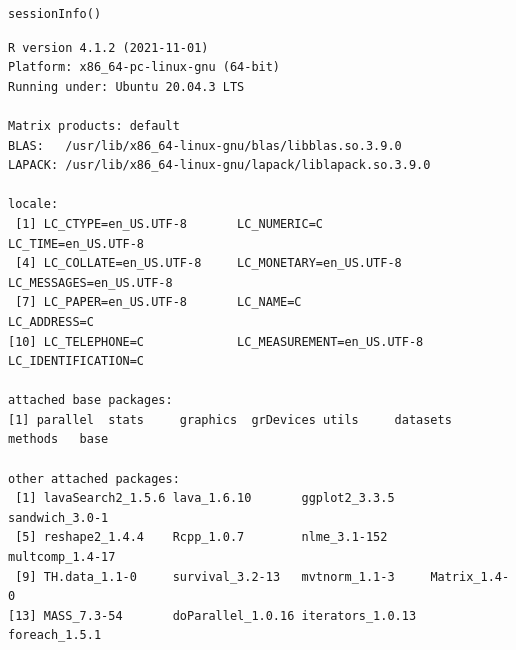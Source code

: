 \documentclass[12pt]{article}
\begin{document}
\lstset{language=r,label= ,caption= ,captionpos=b,numbers=none}
\begin{lstlisting}
sessionInfo()
\end{lstlisting}

\begin{verbatim}
R version 4.1.2 (2021-11-01)
Platform: x86_64-pc-linux-gnu (64-bit)
Running under: Ubuntu 20.04.3 LTS

Matrix products: default
BLAS:   /usr/lib/x86_64-linux-gnu/blas/libblas.so.3.9.0
LAPACK: /usr/lib/x86_64-linux-gnu/lapack/liblapack.so.3.9.0

locale:
 [1] LC_CTYPE=en_US.UTF-8       LC_NUMERIC=C               LC_TIME=en_US.UTF-8       
 [4] LC_COLLATE=en_US.UTF-8     LC_MONETARY=en_US.UTF-8    LC_MESSAGES=en_US.UTF-8   
 [7] LC_PAPER=en_US.UTF-8       LC_NAME=C                  LC_ADDRESS=C              
[10] LC_TELEPHONE=C             LC_MEASUREMENT=en_US.UTF-8 LC_IDENTIFICATION=C       

attached base packages:
[1] parallel  stats     graphics  grDevices utils     datasets  methods   base     

other attached packages:
 [1] lavaSearch2_1.5.6 lava_1.6.10       ggplot2_3.3.5     sandwich_3.0-1   
 [5] reshape2_1.4.4    Rcpp_1.0.7        nlme_3.1-152      multcomp_1.4-17  
 [9] TH.data_1.1-0     survival_3.2-13   mvtnorm_1.1-3     Matrix_1.4-0     
[13] MASS_7.3-54       doParallel_1.0.16 iterators_1.0.13  foreach_1.5.1    


\end{verbatim}
\end{document}
